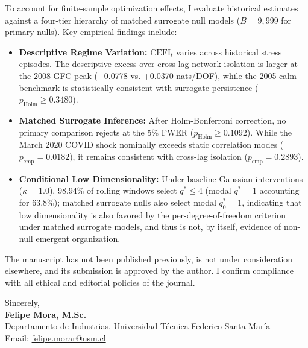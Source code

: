 \documentclass[10pt]{article}
\begin{document}
\vspace{1mm}
\noindent
To account for finite-sample optimization effects, I evaluate historical estimates against a four-tier hierarchy of matched surrogate null models ($B=9,999$ for primary nulls). Key empirical findings include:
\begin{itemize}\setlength{\itemsep}{0pt}\setlength{\parskip}{0pt}\setlength{\parsep}{0pt}
    \item \textbf{Descriptive Regime Variation:} $\mathrm{CEFI}_t$ varies across historical stress episodes. The descriptive excess over cross-lag network isolation is larger at the 2008 GFC peak (+0.0778 vs. +0.0370 nats/DOF), while the 2005 calm benchmark is statistically consistent with surrogate persistence ($p_{\text{Holm}} \ge 0.3480$).
    \item \textbf{Matched Surrogate Inference:} After Holm-Bonferroni correction, no primary comparison rejects at the 5\% FWER ($p_{\text{Holm}} \ge 0.1092$). While the March 2020 COVID shock nominally exceeds static correlation modes ($p_{\text{emp}} = 0.0182$), it remains consistent with cross-lag isolation ($p_{\text{emp}} = 0.2893$).
    \item \textbf{Conditional Low Dimensionality:} Under baseline Gaussian interventions ($\kappa = 1.0$), 98.94\% of rolling windows select $q^* \le 4$ (modal $q^* = 1$ accounting for 63.8\%); matched surrogate nulls also select modal $q_0^* = 1$, indicating that low dimensionality is also favored by the per-degree-of-freedom criterion under matched surrogate models, and thus is not, by itself, evidence of non-null emergent organization.
\end{itemize}

\vspace{1mm}
\noindent
The manuscript has not been published previously, is not under consideration elsewhere, and its submission is approved by the author. I confirm compliance with all ethical and editorial policies of the journal.

\vspace{2.5mm}
\noindent
Sincerely, \\[1.5mm]
\textbf{Felipe Mora, M.Sc.} \\
Departamento de Industrias, Universidad Técnica Federico Santa María \\
Email: \href{mailto:felipe.morar@usm.cl}{felipe.morar@usm.cl}
\end{document}
